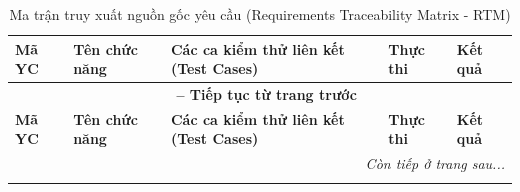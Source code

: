 {\small
\begin{longtable}{p{2.3cm}p{3.5cm}p{5.8cm}p{1.7cm}p{1.8cm}}
\caption{Ma trận truy xuất nguồn gốc yêu cầu (Requirements Traceability Matrix - RTM)} \label{tab:rtm_full_table} \\
\toprule
\textbf{Mã YC} & \textbf{Tên chức năng} & \textbf{Các ca kiểm thử liên kết (Test Cases)} & \textbf{Thực thi} & \textbf{Kết quả} \\
\midrule
\endfirsthead

\multicolumn{5}{c}{{\bfseries \tablename\ \thetable{} -- Tiếp tục từ trang trước}} \\
\toprule
\textbf{Mã YC} & \textbf{Tên chức năng} & \textbf{Các ca kiểm thử liên kết (Test Cases)} & \textbf{Thực thi} & \textbf{Kết quả} \\
\midrule
\endhead

\midrule \multicolumn{5}{r}{{\slshape Còn tiếp ở trang sau...}} \\
\endfoot

\bottomrule
\endlastfoot


\end{longtable}}
